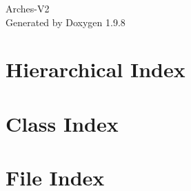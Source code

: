 \documentclass[twoside]{book}
\newcommand{\+}{\discretionary{\mbox{\scriptsize$\hookleftarrow$}}{}{}}
\newcommand{\clearemptydoublepage}{%
    \newpage{\pagestyle{empty}\cleardoublepage}%
  }
\begin{document}
  \raggedbottom
    \hypersetup{pageanchor=false,
                bookmarksnumbered=true,
                pdfencoding=unicode
               }
  \begin{titlepage}
  \vspace*{7cm}
  \begin{center}%
  {\Large Arches-\/\+V2}\\
  \vspace*{1cm}
  {\large Generated by Doxygen 1.9.8}\\
  \end{center}
  \end{titlepage}
  \clearemptydoublepage
  \tableofcontents
  \clearemptydoublepage
  \hypersetup{pageanchor=true}

\chapter{Hierarchical Index}

\chapter{Class Index}

\chapter{File Index}

\end{document}
